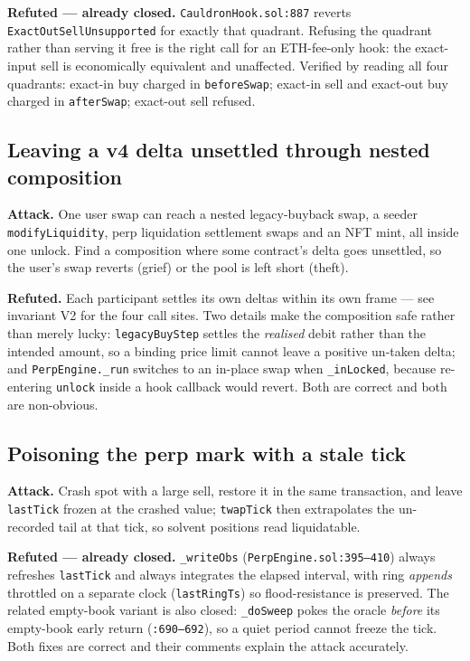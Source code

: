 \documentclass[11pt,a4paper]{article}
\newcommand{\code}[1]{\texttt{\small #1}}
\newcommand{\fileref}[1]{\texttt{\scriptsize #1}}
\begin{document}
\textbf{Refuted --- already closed.} \fileref{CauldronHook.sol:887} reverts
\code{ExactOutSellUnsupported} for exactly that quadrant. Refusing the quadrant
rather than serving it free is the right call for an ETH-fee-only hook: the
exact-input sell is economically equivalent and unaffected. Verified by reading
all four quadrants: exact-in buy charged in \code{beforeSwap}; exact-in sell and
exact-out buy charged in \code{afterSwap}; exact-out sell refused.

\subsection*{Leaving a v4 delta unsettled through nested composition}
\textbf{Attack.} One user swap can reach a nested legacy-buyback swap, a seeder
\code{modifyLiquidity}, perp liquidation settlement swaps and an NFT mint, all
inside one unlock. Find a composition where some contract's delta goes unsettled,
so the user's swap reverts (grief) or the pool is left short (theft).

\textbf{Refuted.} Each participant settles its own deltas within its own frame ---
see invariant V2 for the four call sites. Two details make the composition safe
rather than merely lucky: \code{legacyBuyStep} settles the \emph{realised} debit
rather than the intended amount, so a binding price limit cannot leave a positive
un-taken delta; and \code{PerpEngine.\_run} switches to an in-place swap when
\code{\_inLocked}, because re-entering \code{unlock} inside a hook callback would
revert. Both are correct and both are non-obvious.

\subsection*{Poisoning the perp mark with a stale tick}
\textbf{Attack.} Crash spot with a large sell, restore it in the same transaction,
and leave \code{lastTick} frozen at the crashed value; \code{twapTick} then
extrapolates the un-recorded tail at that tick, so solvent positions read
liquidatable.

\textbf{Refuted --- already closed.} \code{\_writeObs}
(\fileref{PerpEngine.sol:395--410}) always refreshes \code{lastTick} and always
integrates the elapsed interval, with ring \emph{appends} throttled on a separate
clock (\code{lastRingTs}) so flood-resistance is preserved. The related
empty-book variant is also closed: \code{\_doSweep} pokes the oracle
\emph{before} its empty-book early return (\fileref{:690--692}), so a quiet period
cannot freeze the tick. Both fixes are correct and their comments explain the
attack accurately.
\end{document}

